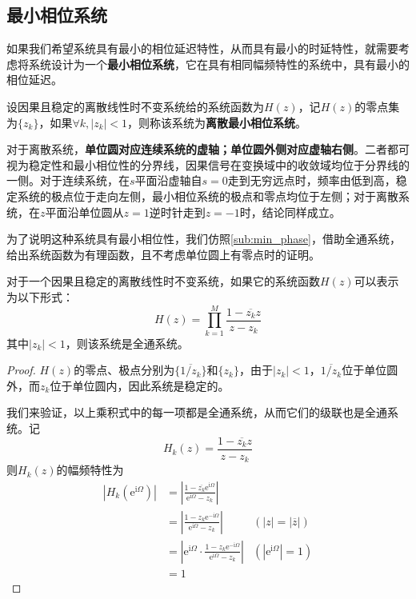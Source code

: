 \subsection{最小相位系统}\label{sub:minimum_phase}

如果我们希望系统具有最小的相位延迟特性，从而具有最小的时延特性，就需要考虑将系统设计为一个\textbf{最小相位系统}，它在具有相同幅频特性的系统中，具有最小的相位延迟。
\begin{definition}[离散最小相位系统]
    设因果且稳定的离散线性时不变系统给的系统函数为$H(z)$，记$H(z)$的零点集为$\{z_k\}$，如果$\forall k,|z_k|<1$，则称该系统为\textbf{离散最小相位系统}。
\end{definition} 

对于离散系统，\textbf{单位圆对应连续系统的虚轴；单位圆外侧对应虚轴右侧}。二者都可视为稳定性和最小相位性的分界线，因果信号在变换域中的收敛域均位于分界线的一侧。对于连续系统，在$s$平面沿虚轴自$s=0$走到无穷远点时，频率由低到高，稳定系统的极点位于走向左侧，最小相位系统的极点和零点均位于左侧；对于离散系统，在$z$平面沿单位圆从$z=1$逆时针走到$z=-1$时，结论同样成立。

为了说明这种系统具有最小相位性，我们仿照\ref{sub:min_phase}，借助全通系统，给出系统函数为有理函数，且不考虑单位圆上有零点时的证明。

\begin{lemma}[离散全通系统]
    对于一个因果且稳定的离散线性时不变系统，如果它的系统函数$H(z)$可以表示为以下形式：
    $$H(z)=\prod_{k=1}^{M}\frac{1-\overline{z_k}z}{z-z_k}$$
    其中$|z_k|<1$，则该系统是全通系统。
\end{lemma}
\begin{proof}
    $H(z)$的零点、极点分别为$\{\overline{1/z_k}\}$和$\{z_k\}$，由于$|z_k|<1$，$\overline{1/z_k}$位于单位圆外，而$z_k$位于单位圆内，因此系统是稳定的。

    我们来验证，以上乘积式中的每一项都是全通系统，从而它们的级联也是全通系统。记
    $$H_k(z)=\frac{1-\overline{z_k}z}{z-z_k}$$
    则$H_k(z)$的幅频特性为\begin{align*}
        |H_k(\mathrm{e}^{\mathrm{i}\Omega})|&=\left|\frac{1-\overline{z_k}\mathrm{e}^{\mathrm{i}\Omega}}{\mathrm{e}^{\mathrm{i}\Omega}-z_k}\right|\\
        &=\left|\frac{1-z_k \mathrm{e}^{-\mathrm{i}\Omega}}{\mathrm{e}^{\mathrm{i}\Omega}-z_k}\right|&(|z|=|\overline{z}|)\\
        &=\left|\mathrm{e}^{\mathrm{i}\Omega}\cdot\frac{1-z_k \mathrm{e}^{-\mathrm{i}\Omega}}{\mathrm{e}^{\mathrm{i}\Omega}-z_k}\right|&(|\mathrm{e}^{\mathrm{i}\Omega}|=1)\\
        &=1
    \end{align*}
\end{proof}

